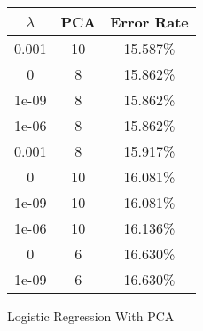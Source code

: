 \begin{center}
\begin{tabular}{|c|c|c|}
\hline
$\lambda$ & PCA & Error Rate \\
\hline
0.001 & 10 & 15.587\% \\
\hline
0 & 8 & 15.862\% \\
\hline
1e-09 & 8 & 15.862\% \\
\hline
1e-06 & 8 & 15.862\% \\
\hline
0.001 & 8 & 15.917\% \\
\hline
0 & 10 & 16.081\% \\
\hline
1e-09 & 10 & 16.081\% \\
\hline
1e-06 & 10 & 16.136\% \\
\hline
0 & 6 & 16.630\% \\
\hline
1e-09 & 6 & 16.630\% \\
\hline
\end{tabular}
\end{center}
\caption{Logistic Regression With PCA}\label{tab:logreg_pca_acctable}

